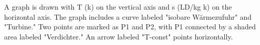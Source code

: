 A graph is drawn with T (k) on the vertical axis and s (LD/kg k) on the horizontal axis. The graph includes a curve labeled "isobare Wärmezufuhr" and "Turbine." Two points are marked as P1 and P2, with P1 connected by a shaded area labeled "Verdichter." An arrow labeled "T-const" points horizontally.
